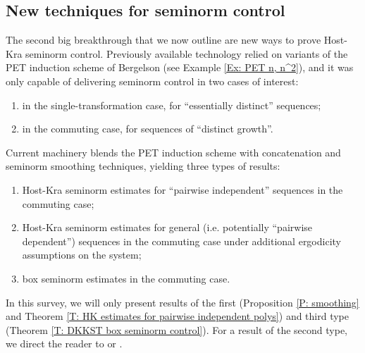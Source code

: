 \documentclass[11pt]{amsart}
\theoremstyle{definition}
\newcommand{\1}{{\mathbf{1}}}
\begin{document}
\subsection{New techniques for seminorm control}\label{S: seminorm smoothing}

The second big breakthrough that we now outline are new ways to prove Host-Kra seminorm control. %
Previously available technology relied on variants of the PET induction scheme of Bergelson \cite{Ber87} (see Example \ref{Ex: PET n, n^2}), and it was only capable of delivering seminorm control in two cases of interest:
\begin{enumerate}
    \item in the single-transformation case, for ``essentially distinct'' sequences;
    \item in the commuting case, for sequences of ``distinct growth''.
\end{enumerate}
Current machinery blends the PET induction scheme with concatenation and seminorm smoothing techniques, yielding three types of results:
\begin{enumerate}
    \item Host-Kra seminorm estimates for ``pairwise independent'' sequences in the commuting case;
    \item Host-Kra seminorm estimates for general (i.e. potentially ``pairwise dependent'') sequences in the commuting case under additional ergodicity assumptions on the system;
    \item box seminorm estimates in the commuting case.
\end{enumerate}
In this survey, we will only present results of the first (Proposition \ref{P: smoothing} and Theorem \ref{T: HK estimates for pairwise independent polys}) and third type (Theorem \ref{T: DKKST box seminorm control}). For a result of the second type, we direct the reader to \cite[Theorem 1.1]{FrKu22b} or \cite[Theorem 4.10]{DKKST25}. %
\end{document}
